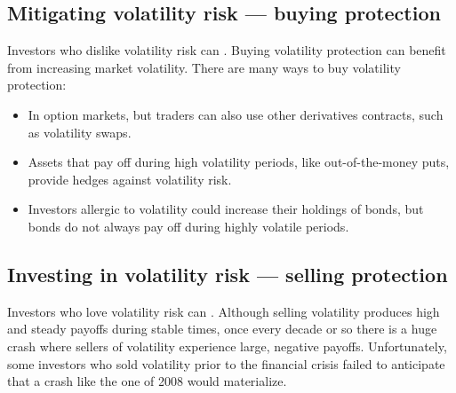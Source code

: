 \subsection{Mitigating volatility risk --- buying protection}

Investors who dislike volatility risk can .
Buying volatility protection can benefit from increasing market volatility. There
are many ways to buy volatility protection:

\begin{itemize}
\item In option markets, but traders can also use other derivatives contracts,
such as volatility swaps.
\item Assets that pay off during high volatility periods, like out-of-the-money
puts, provide hedges against volatility risk.
\item Investors allergic to volatility could increase their holdings of bonds,
but bonds do not always pay off during highly volatile periods.
\end{itemize}

\subsection{Investing in volatility risk --- selling protection}

Investors who love volatility risk can .
Although selling volatility produces high and steady payoffs during stable times,
once every decade or so there is a huge crash where sellers of volatility
experience large, negative payoffs. Unfortunately, some investors who sold
volatility prior to the financial crisis failed to anticipate that a crash like
the one of 2008 would materialize.

